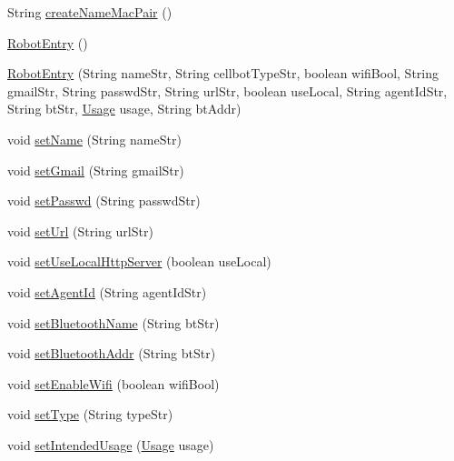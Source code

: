 \begin{DoxyCompactItemize}
\item 
String \hyperlink{classcom_1_1cellbots_1_1_robot_entry_a18cd20e0a037979e870b6d6e8d33ba54}{create\-Name\-Mac\-Pair} ()
\item 
\hyperlink{classcom_1_1cellbots_1_1_robot_entry_af59230d9bfa4eee800942ddc4521cf92}{Robot\-Entry} ()
\item 
\hyperlink{classcom_1_1cellbots_1_1_robot_entry_aeab4d5f8e026322abed192d9cd1247b5}{Robot\-Entry} (String name\-Str, String cellbot\-Type\-Str, boolean wifi\-Bool, String gmail\-Str, String passwd\-Str, String url\-Str, boolean use\-Local, String agent\-Id\-Str, String bt\-Str, \hyperlink{enumcom_1_1cellbots_1_1_robot_entry_1_1_usage}{Usage} usage, String bt\-Addr)
\item 
void \hyperlink{classcom_1_1cellbots_1_1_robot_entry_a219ff35c0f4ebdb2b3110eaf28573b34}{set\-Name} (String name\-Str)
\item 
void \hyperlink{classcom_1_1cellbots_1_1_robot_entry_a79ed438372e66eb04226732c2c87e189}{set\-Gmail} (String gmail\-Str)
\item 
void \hyperlink{classcom_1_1cellbots_1_1_robot_entry_a7c0e995686515e39cab898c80fb2a246}{set\-Passwd} (String passwd\-Str)
\item 
void \hyperlink{classcom_1_1cellbots_1_1_robot_entry_abaa1b3c14324e22559d571038925478b}{set\-Url} (String url\-Str)
\item 
void \hyperlink{classcom_1_1cellbots_1_1_robot_entry_a0da55567dcc8491d72f68785b0732e28}{set\-Use\-Local\-Http\-Server} (boolean use\-Local)
\item 
void \hyperlink{classcom_1_1cellbots_1_1_robot_entry_ad33efb289a2335906506b5acc0a9870c}{set\-Agent\-Id} (String agent\-Id\-Str)
\item 
void \hyperlink{classcom_1_1cellbots_1_1_robot_entry_a58dac8b3f8c7722c053fdfbdccabe3a3}{set\-Bluetooth\-Name} (String bt\-Str)
\item 
void \hyperlink{classcom_1_1cellbots_1_1_robot_entry_a677e88fac046d719eb164e850b897dea}{set\-Bluetooth\-Addr} (String bt\-Str)
\item 
void \hyperlink{classcom_1_1cellbots_1_1_robot_entry_a6e7beeb09276b3b5bb2e94dc1116d6a0}{set\-Enable\-Wifi} (boolean wifi\-Bool)
\item 
void \hyperlink{classcom_1_1cellbots_1_1_robot_entry_a5afb2b421d500fc9bae663ea9e84e5eb}{set\-Type} (String type\-Str)
\item 
void \hyperlink{classcom_1_1cellbots_1_1_robot_entry_a1ebddf3209374c7f4d83b882c997e23e}{set\-Intended\-Usage} (\hyperlink{enumcom_1_1cellbots_1_1_robot_entry_1_1_usage}{Usage} usage)

\end{DoxyCompactItemize}
